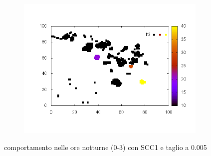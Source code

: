 \documentclass[10pt,a4paper]{article}
\begin{document}
\begin{figure}
\begin{subfigure}[b]{1\textwidth}
\includegraphics[scale=.5]{./img/stampe/scc1/3.png}
\end{subfigure}
\caption{comportamento nelle ore notturne (0-3) con SCC1 e taglio a 0.005}
\label{scc1_0-005_night}
\end{figure}
\end{document}
